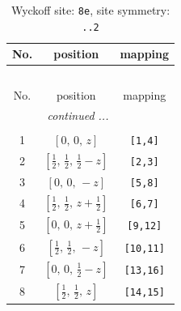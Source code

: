 \documentclass[fleqn,8pt]{jsarticle}
\begin{document}
\renewcommand{\arraystretch}{1.2}
\begin{longtable}{ccc}
\caption{Wyckoff site: {\tt 8e}, site symmetry: {\tt ..2}}
 \\
 \hline \hline
No. & position & mapping \\ \hline \endfirsthead

\multicolumn{2}{l}{\tablename\ \thetable{}} \\
 \hline \hline
No. & position & mapping \\ \hline \endhead

 \hline \hline
\multicolumn{2}{r}{\footnotesize\it continued ...} \\ \endfoot

 \hline \hline
\multicolumn{2}{r}{} \\ \endlastfoot

1 & $\left[ 0,\, 0,\, z \right]$ & {\tt [1,4]} \\ \hline
2 & $\left[ \frac{1}{2},\, \frac{1}{2},\, \frac{1}{2} - z \right]$ & {\tt [2,3]} \\ \hline
3 & $\left[ 0,\, 0,\, - z \right]$ & {\tt [5,8]} \\ \hline
4 & $\left[ \frac{1}{2},\, \frac{1}{2},\, z + \frac{1}{2} \right]$ & {\tt [6,7]} \\ \hline
5 & $\left[ 0,\, 0,\, z + \frac{1}{2} \right]$ & {\tt [9,12]} \\ \hline
6 & $\left[ \frac{1}{2},\, \frac{1}{2},\, - z \right]$ & {\tt [10,11]} \\ \hline
7 & $\left[ 0,\, 0,\, \frac{1}{2} - z \right]$ & {\tt [13,16]} \\ \hline
8 & $\left[ \frac{1}{2},\, \frac{1}{2},\, z \right]$ & {\tt [14,15]} \\
\end{longtable}
\renewcommand{\arraystretch}{1.2}
\end{document}

